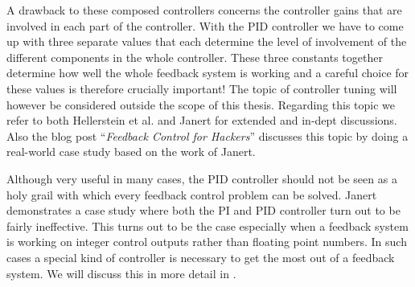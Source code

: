A drawback to these composed controllers concerns the controller gains that are involved in each part of the controller. With the PID controller we have to come up with three separate values that each determine the level of involvement of the different components in the whole controller. These three constants together determine how well the whole feedback system is working and a careful choice for these values is therefore crucially important! The topic of controller tuning will however be considered outside the scope of this thesis. Regarding this topic we refer to both Hellerstein et al. and Janert \cite{hellerstein2004-feedback, janert2013-feedback} for extended and in-dept discussions. Also the blog post ``\textit{Feedback Control for Hackers}'' \cite{heest2015-feedback-for-hackers} discusses this topic by doing a real-world case study based on the work of Janert.

Although very useful in many cases, the PID controller should not be seen as a holy grail with which every feedback control problem can be solved. Janert \cite{janert2013-feedback} demonstrates a case study where both the PI and PID controller turn out to be fairly ineffective. This turns out to be the case especially when a feedback system is working on integer control outputs rather than floating point numbers. In such cases a special kind of controller is necessary to get the most out of a feedback system. We will discuss this in more detail in .
